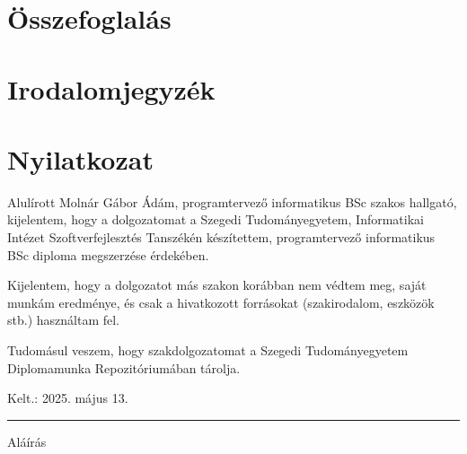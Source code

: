\documentclass[12pt]{report} %
\begin{document}
\chapter{Összefoglalás} %

\chapter*{Irodalomjegyzék} %

\printbibliography[heading=none] %

\chapter*{Nyilatkozat} %

Alulírott Molnár Gábor Ádám, programtervező informatikus BSc szakos hallgató, kijelentem, hogy a dolgozatomat a Szegedi Tudományegyetem, Informatikai Intézet Szoftverfejlesztés Tanszékén készítettem, programtervező informatikus BSc diploma megszerzése érdekében.

Kijelentem, hogy a dolgozatot más szakon korábban nem védtem meg, saját munkám eredménye, és csak a hivatkozott forrásokat (szakirodalom, eszközök stb.) használtam fel.

Tudomásul veszem, hogy szakdolgozatomat a Szegedi Tudományegyetem Diplomamunka Repozitóriumában tárolja.

\vspace{1cm}

{\large Kelt.: 2025. május 13.}

\vspace{0.5cm}
\hfill
\parbox{5cm}{\centering\hrule\vspace{0.3cm} Aláírás}
\end{document}
